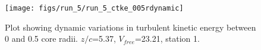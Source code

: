 \begin{figure}[H]
\centering
\texttt{[image: figs/run\_5/run\_5\_ctke\_005rdynamic]}
\caption{Plot showing dynamic variations in turbulent kinetic energy between 0 and 0.5 core radii. $z/c$=5.37, $V_{free}$=23.21, station 1.}
\label{fig:run_5_ctke_005rdynamic}
\end{figure}


